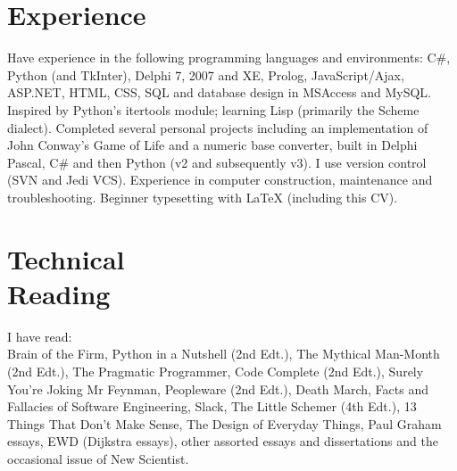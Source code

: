 \documentclass[line,margin]{res}
\newcommand{\ampersand}{\&}
\newcommand{\hash}{\#}
\newcommand{\CSharp}{C\hash}
\begin{document}
\begin{resume}
\begin{position}
\begin{comment}
\begin{tabular}{ l r r }
	Mathematics & (a year early) GCSE & A* \\
	Science & Double Award GCSE & AA \\
	English & GCSE & A \\
	History & GCSE & B \\
	Systems {\ampersand} Control & GCSE & B \\
	ICT & Short Course GCSE & C \\
	Statistics & GCSE & C \\
	English Literature & GCSE & C \\
	Geography & GCSE & D \\
	Drama & GCSE & F \\
\end{tabular}
\end{comment}
\end{position}

\section{Experience}
Have experience in the following programming languages and environments: {\CSharp}, Python (and TkInter), Delphi 7, 2007 and XE, Prolog, JavaScript/Ajax, ASP.NET, HTML, CSS, SQL and database design in MSAccess and MySQL. Inspired by Python's itertools module; learning Lisp (primarily the Scheme dialect).
Completed several personal projects including an implementation of John Conway's Game of Life and a numeric base converter, built in Delphi Pascal, {\CSharp} and then Python (v2 and subsequently v3).
I use version control (SVN and Jedi VCS).
Experience in computer construction, maintenance and troubleshooting. Beginner typesetting with {\LaTeX} (including this CV).

\section{Technical \\ Reading}
I have read: \\
Brain of the Firm,
Python in a Nutshell (2nd Edt.),
The Mythical Man-Month (2nd Edt.),
The Pragmatic Programmer,
Code Complete (2nd Edt.),
Surely You're Joking Mr Feynman,
Peopleware (2nd Edt.),
Death March,
Facts and Fallacies of Software Engineering,
Slack,
The Little Schemer (4th Edt.),
13 Things That Don't Make Sense,
The Design of Everyday Things,
Paul Graham essays,
EWD (Dijkstra essays),
other assorted essays and dissertations and
the occasional issue of New Scientist.


\end{resume}
\end{document}
